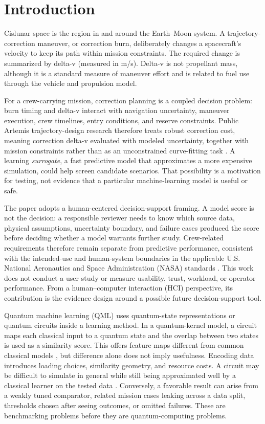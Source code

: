 \section{Introduction}

Cislunar space is the region in and around the Earth--Moon system. A
trajectory-correction maneuver, or correction burn, deliberately changes a
spacecraft's velocity to keep its path within mission constraints. The required
change is summarized by delta-v (measured in m/s). Delta-v is not propellant
mass, although it is a standard measure of maneuver effort and is related to
fuel use through the vehicle and propulsion model.

For a crew-carrying mission, correction planning is a coupled decision problem:
burn timing and delta-v interact with navigation uncertainty, maneuver
execution, crew timelines, entry conditions, and reserve constraints. Public
Artemis trajectory-design research therefore treats robust correction cost,
meaning correction delta-v evaluated with modeled uncertainty, together with
mission constraints rather than as an unconstrained curve-fitting task
\cite{woffinden2023}. A learning \emph{surrogate}, a fast predictive model that
approximates a more expensive simulation, could help screen candidate scenarios.
That possibility is a motivation for testing, not evidence that a particular
machine-learning model is useful or safe.

The paper adopts a human-centered decision-support framing. A model score is
not the decision: a responsible reviewer needs to know which source data,
physical assumptions, uncertainty boundary, and failure cases produced the
score before deciding whether a model warrants further study. Crew-related
requirements therefore remain separate from predictive performance, consistent
with the intended-use and human-system boundaries in the applicable U.S.
National Aeronautics and Space Administration (NASA) standards
\cite{nasa7009,nasa3001}. This work does not conduct a user study or measure
usability, trust, workload, or operator performance. From a human--computer
interaction (HCI) perspective, its contribution is the evidence design around
a possible future decision-support tool.

Quantum machine learning (QML) uses quantum-state representations or quantum
circuits inside a learning method. In a quantum-kernel model, a circuit maps
each classical input to a quantum state and the overlap between two states is
used as a similarity score. This offers feature maps different from common
classical models \cite{schuld2019,havlicek2019}, but difference alone does not
imply usefulness. Encoding data introduces loading choices, similarity
geometry, and resource costs. A circuit may be difficult to simulate in general
while still being approximated well by a classical learner on the tested data
\cite{huang2021,sweke2025}. Conversely, a favorable result can arise from a
weakly tuned comparator, related mission cases leaking across a data split,
thresholds chosen after seeing outcomes, or omitted failures. These are
benchmarking problems before they are quantum-computing problems.

